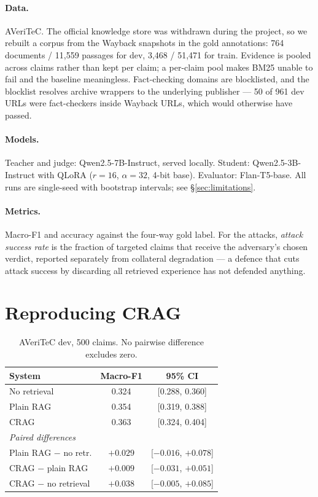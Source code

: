 \documentclass[11pt]{article}
\begin{document}
\paragraph{Data.} AVeriTeC. The official knowledge store was withdrawn during
the project, so we rebuilt a corpus from the Wayback snapshots in the gold
annotations: 764 documents / 11{,}559 passages for dev, 3{,}468 / 51{,}471 for
train. Evidence is pooled across claims rather than kept per claim; a per-claim
pool makes BM25 unable to fail and the baseline meaningless. Fact-checking
domains are blocklisted, and the blocklist resolves archive wrappers to the
underlying publisher --- 50 of 961 dev URLs were fact-checkers inside Wayback
URLs, which would otherwise have passed.

\paragraph{Models.} Teacher and judge: Qwen2.5-7B-Instruct, served locally.
Student: Qwen2.5-3B-Instruct with QLoRA ($r{=}16$, $\alpha{=}32$, 4-bit base).
Evaluator: Flan-T5-base. All runs are single-seed with bootstrap intervals;
see \S\ref{sec:limitations}.

\paragraph{Metrics.} Macro-F1 and accuracy against the four-way gold label. For
the attacks, \emph{attack success rate} is the fraction of targeted claims that
receive the adversary's chosen verdict, reported separately from collateral
degradation --- a defence that cuts attack success by discarding all retrieved
experience has not defended anything.

\section{Reproducing CRAG}
\label{sec:crag}

\begin{table}[t]
\centering\small
\begin{tabular}{lcc}
\toprule
System & Macro-F1 & 95\% CI \\
\midrule
No retrieval & 0.324 & [0.288, 0.360] \\
Plain RAG    & 0.354 & [0.319, 0.388] \\
CRAG         & 0.363 & [0.324, 0.404] \\
\midrule
\multicolumn{3}{l}{\emph{Paired differences}} \\
Plain RAG $-$ no retr. & $+0.029$ & [$-0.016$, $+0.078$] \\
CRAG $-$ plain RAG     & $+0.009$ & [$-0.031$, $+0.051$] \\
CRAG $-$ no retrieval  & $+0.038$ & [$-0.005$, $+0.085$] \\
\bottomrule
\end{tabular}
\caption{AVeriTeC dev, 500 claims. No pairwise difference excludes zero.}
\label{tab:crag}
\end{table}
\end{document}
